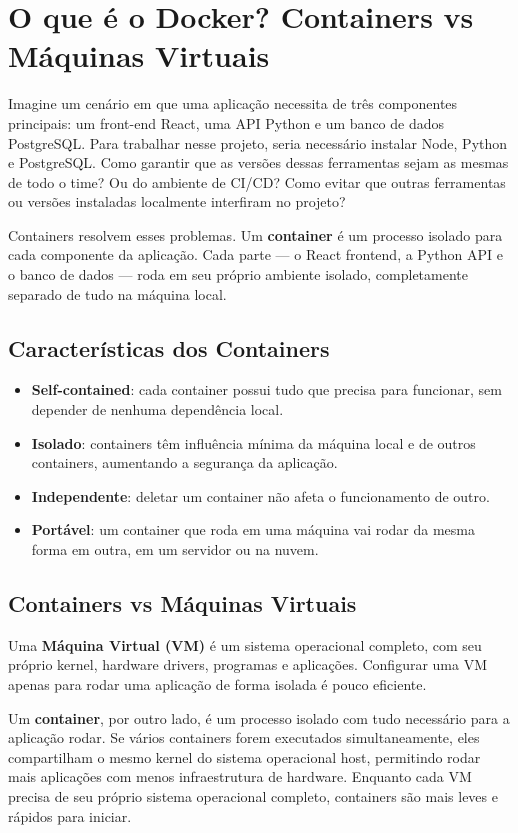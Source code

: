 \section{O que é o Docker? Containers vs Máquinas Virtuais}

Imagine um cenário em que uma aplicação necessita de três componentes principais: um front-end React, uma API Python e um banco de dados PostgreSQL. Para trabalhar nesse projeto, seria necessário instalar Node, Python e PostgreSQL. Como garantir que as versões dessas ferramentas sejam as mesmas de todo o time? Ou do ambiente de CI/CD? Como evitar que outras ferramentas ou versões instaladas localmente interfiram no projeto?

Containers resolvem esses problemas. Um \textbf{container} é um processo isolado para cada componente da aplicação. Cada parte --- o React frontend, a Python API e o banco de dados --- roda em seu próprio ambiente isolado, completamente separado de tudo na máquina local.

\subsection{Características dos Containers}

\begin{itemize}
    \item \textbf{Self-contained}: cada container possui tudo que precisa para funcionar, sem depender de nenhuma dependência local.
    \item \textbf{Isolado}: containers têm influência mínima da máquina local e de outros containers, aumentando a segurança da aplicação.
    \item \textbf{Independente}: deletar um container não afeta o funcionamento de outro.
    \item \textbf{Portável}: um container que roda em uma máquina vai rodar da mesma forma em outra, em um servidor ou na nuvem.
\end{itemize}

\subsection{Containers vs Máquinas Virtuais}

Uma \textbf{Máquina Virtual (VM)} é um sistema operacional completo, com seu próprio kernel, hardware drivers, programas e aplicações. Configurar uma VM apenas para rodar uma aplicação de forma isolada é pouco eficiente.

Um \textbf{container}, por outro lado, é um processo isolado com tudo necessário para a aplicação rodar. Se vários containers forem executados simultaneamente, eles compartilham o mesmo kernel do sistema operacional host, permitindo rodar mais aplicações com menos infraestrutura de hardware. Enquanto cada VM precisa de seu próprio sistema operacional completo, containers são mais leves e rápidos para iniciar.


